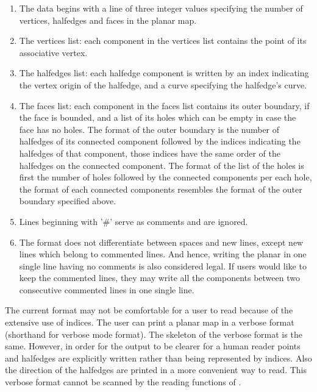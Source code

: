 \begin{ccAdvanced}
\begin{enumerate}

\item The data begins with a line of three integer values specifying
the number of vertices, halfedges and faces in the planar map.
\item The vertices list: each component in the vertices list contains
the point of its associative vertex. 
\item The halfedges list: each halfedge component is written by an
index indicating the vertex origin of the halfedge, and a curve
specifying the halfedge's curve.
\item The faces list: each component in the faces list contains its
outer boundary, if the face is bounded, and a list of its holes which
can be empty in case the face has no holes. The format of the outer
boundary is the number of halfedges of its connected component
followed by the indices indicating the halfedges of that component,
those indices have the same order of the halfedges on the connected
component. The format of the list of the holes is first the number of
holes followed by the connected components per each hole, the format
of each connected components resembles the format of the outer
boundary specified above.
\item Lines beginning with '\#' serve as comments and are ignored.
\item The format does not differentiate between spaces and new lines, 
except new lines which belong to commented lines. 
And hence, writing the planar in one single line having no comments is
also considered legal. If users would like to keep the commented
lines, they may write all the components between two consecutive
commented lines in one single line.

\end{enumerate}

The current format may not be comfortable for a user to read because
of the extensive use of indices. The user can print a planar map in a
verbose format (shorthand for verbose mode format).  The skeleton of 
the verbose format is the same. However, in order for the output to be
clearer for a human reader points and halfedges are explicitly written
rather than being represented by indices. Also the direction of the
halfedges are printed in a more convenient way to read. This verbose
format cannot be scanned by the reading functions of
.

\ccExample


\end{ccAdvanced}
